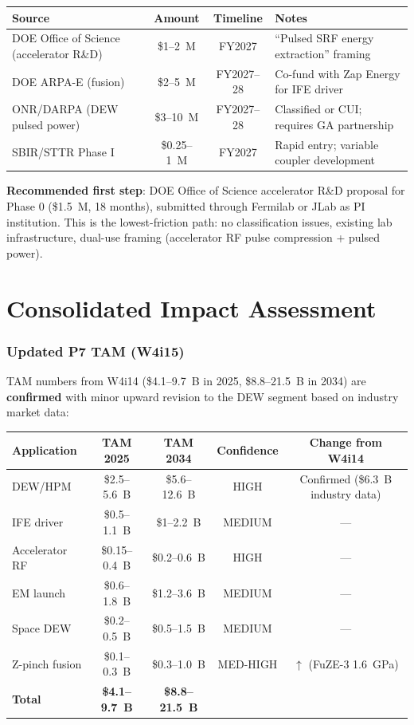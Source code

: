 \documentclass[11pt]{article}
\begin{document}
\begin{center}
\begin{tabular}{p{3.5cm}ccp{4cm}}
\toprule
Source & Amount & Timeline & Notes \\
\midrule
DOE Office of Science (accelerator R\&D) & \$1--2~M & FY2027 &
  ``Pulsed SRF energy extraction'' framing \\
DOE ARPA-E (fusion) & \$2--5~M & FY2027--28 &
  Co-fund with Zap Energy for IFE driver \\
ONR/DARPA (DEW pulsed power) & \$3--10~M & FY2027--28 &
  Classified or CUI; requires GA partnership \\
SBIR/STTR Phase I & \$0.25--1~M & FY2027 &
  Rapid entry; variable coupler development \\
\bottomrule
\end{tabular}
\end{center}

\textbf{Recommended first step}: DOE Office of Science accelerator
R\&D proposal for Phase 0 (\$1.5~M, 18 months), submitted through
Fermilab or JLab as PI institution. This is the lowest-friction
path: no classification issues, existing lab infrastructure,
dual-use framing (accelerator RF pulse compression + pulsed power).

\part{Consolidated Impact Assessment}
\label{part:impact}

\section{Updated P7 TAM (W4i15)}

TAM numbers from W4i14 (\$4.1--9.7~B in 2025, \$8.8--21.5~B in
2034) are \textbf{confirmed} with minor upward revision to the
DEW segment based on industry market data:

\begin{center}
\begin{tabular}{lcccc}
\toprule
Application & TAM 2025 & TAM 2034 & Confidence & Change from W4i14 \\
\midrule
DEW/HPM & \$2.5--5.6~B & \$5.6--12.6~B & HIGH & Confirmed (\$6.3~B
  industry data) \\
IFE driver & \$0.5--1.1~B & \$1--2.2~B & MEDIUM & --- \\
Accelerator RF & \$0.15--0.4~B & \$0.2--0.6~B & HIGH & --- \\
EM launch & \$0.6--1.8~B & \$1.2--3.6~B & MEDIUM & --- \\
Space DEW & \$0.2--0.5~B & \$0.5--1.5~B & MEDIUM & --- \\
Z-pinch fusion & \$0.1--0.3~B & \$0.3--1.0~B & MED-HIGH & $\uparrow$
  (FuZE-3 1.6~GPa) \\
\midrule
\textbf{Total} & \textbf{\$4.1--9.7~B} & \textbf{\$8.8--21.5~B} & & \\
\bottomrule
\end{tabular}
\end{center}
\end{document}
